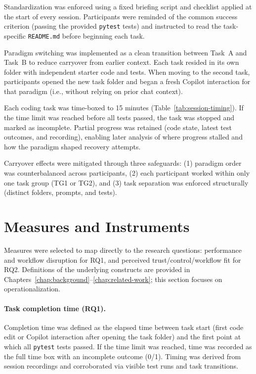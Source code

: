Standardization was enforced using a fixed briefing script and checklist applied at the start of every session. Participants were reminded of the common success criterion (passing the provided \texttt{pytest} tests) and instructed to read the task-specific \texttt{README.md} before beginning each task.

Paradigm switching was implemented as a clean transition between Task~A and Task~B to reduce carryover from earlier context. Each task resided in its own folder with independent starter code and tests. When moving to the second task, participants opened the new task folder and began a fresh Copilot interaction for that paradigm (i.e., without relying on prior chat context).

Each coding task was time-boxed to 15 minutes (Table~\ref{tab:session-timing}). If the time limit was reached before all tests passed, the task was stopped and marked as incomplete. Partial progress was retained (code state, latest test outcomes, and recording), enabling later analysis of where progress stalled and how the paradigm shaped recovery attempts.

Carryover effects were mitigated through three safeguards: (1) paradigm order was counterbalanced across participants, (2) each participant worked within only one task group (TG1 or TG2), and (3) task separation was enforced structurally (distinct folders, prompts, and tests).

\section{Measures and Instruments}
\label{sec:measures}

Measures were selected to map directly to the research questions: performance and workflow disruption for RQ1, and perceived trust/control/workflow fit for RQ2. Definitions of the underlying constructs are provided in Chapters~\ref{chap:background}--\ref{chap:related-work}; this section focuses on operationalization.

\paragraph{Task completion time (RQ1).}
Completion time was defined as the elapsed time between task start (first code edit or Copilot interaction after opening the task folder) and the first point at which all \texttt{pytest} tests passed. If the time limit was reached, time was recorded as the full time box with an incomplete outcome (0/1). Timing was derived from session recordings and corroborated via visible test runs and task transitions.

